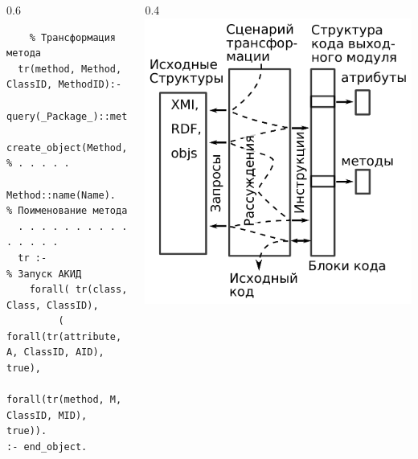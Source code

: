 \documentclass[10pt]{beamer}
\begin{document}
\begin{frame}[fragile]
\begin{columns}
\begin{column}{0.6\textwidth}
\begin{verbatim}
    % Трансформация метода
  tr(method, Method, ClassID, MethodID):-
    query(_Package_)::method(Name,ClassID,MethodID),
    create_object(Method,     % . . . . .
    Method::name(Name).       % Поименование метода
  . . . . . . . . . . . . . . .
  tr :-                       % Запуск АКИД
    forall( tr(class, Class, ClassID),
         ( forall(tr(attribute, A, ClassID, AID), true),
           forall(tr(method, M, ClassID, MID), true)).
:- end_object.
\end{verbatim}
    \end{column}
    \begin{column}{0.4\linewidth}
      \includegraphics[width=1\linewidth]{scenario-ru-wo-mothur.pdf}
    \end{column}
  \end{columns}
\end{frame}
\end{document}
